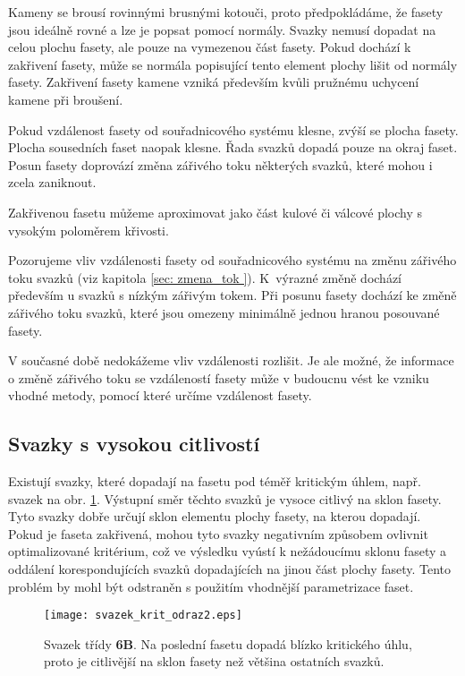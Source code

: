 Kameny se brousí rovinnými brusnými kotouči, proto předpokládáme, že fasety jsou ideálně rovné a lze je popsat pomocí normály. Svazky nemusí dopadat na celou plochu fasety, ale pouze na vymezenou část fasety. Pokud dochází k zakřivení fasety, může se normála popisující tento element plochy lišit od normály fasety. Zakřivení fasety kamene vzniká především kvůli pružnému uchycení kamene při broušení.

Pokud vzdálenost fasety od souřadnicového systému klesne, zvýší se plocha fasety. Plocha sousedních faset naopak klesne. Řada svazků dopadá pouze na okraj faset. Posun fasety doprovází změna zářivého toku některých svazků, které mohou i zcela zaniknout.

Zakřivenou fasetu můžeme aproximovat jako část kulové či válcové plochy s vysokým poloměrem křivosti. 
  
Pozorujeme vliv vzdálenosti fasety od souřadnicového systému na změnu zářivého toku svazků (viz kapitola \ref{sec: zmena_tok }). K~výrazné změně dochází především u svazků s nízkým zářivým tokem. Při posunu fasety dochází ke změně zářivého toku svazků, které jsou omezeny minimálně jednou hranou posouvané fasety. 

V současné době nedokážeme vliv vzdálenosti rozlišit. Je ale možné, že informace o změně zářivého toku se vzdáleností fasety může v budoucnu vést ke vzniku vhodné metody, pomocí které určíme vzdálenost fasety. 

\newpage
\subsection{Svazky s vysokou citlivostí}

Existují svazky, které dopadají na fasetu pod téměř kritickým úhlem, např. svazek na obr. \ref{fig: kritOdrazSvazek}. Výstupní směr těchto svazků je vysoce citlivý na sklon fasety. Tyto svazky dobře určují sklon elementu plochy fasety, na kterou dopadají. Pokud je faseta zakřivená, mohou tyto svazky negativním způsobem ovlivnit optimalizované kritérium, což ve výsledku vyústí k nežádoucímu sklonu fasety a oddálení korespondujících svazků dopadajících na jinou část plochy fasety. Tento problém by mohl být odstraněn s použitím vhodnější parametrizace faset.

\begin{figure}[htbp]
    \centering\texttt{[image: svazek\_krit\_odraz2.eps]}
     \caption[Svazek blízko kritického úhlu.]{Svazek třídy \textbf{6B}. Na poslední fasetu dopadá blízko kritického úhlu, proto je citlivější na sklon fasety než většina ostatních svazků.}
 \label{fig: kritOdrazSvazek}
 \end{figure}
 
 
 \clearpage